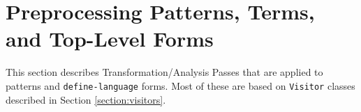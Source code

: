 \chapter{Preprocessing Patterns, Terms, and Top-Level Forms}

This section describes Transformation/Analysis Passes that are applied to patterns and \texttt{define-language} forms. Most of these are based on \texttt{Visitor} classes described in Section \ref{section:visitors}.






%
%






